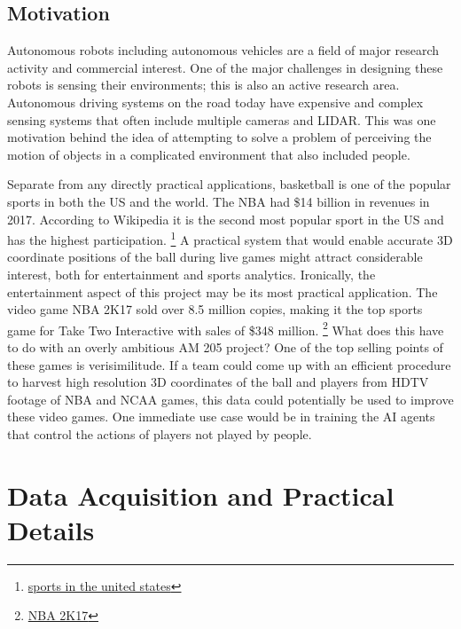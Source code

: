 \documentclass{article}
\begin{document}
\subsection{Motivation}
Autonomous robots including autonomous vehicles are a field of major research activity and commercial interest.
One of the major challenges in designing these robots is sensing their environments; this is also an active research area.
Autonomous driving systems on the road today have expensive and complex sensing systems
that often include multiple cameras and LIDAR.
This was one motivation behind the idea of attempting to solve a problem of perceiving the motion
of objects in a complicated environment that also included people.

Separate from any directly practical applications, basketball is one of the popular sports in both the US and the world.
The NBA had \$14 billion in revenues in 2017.  According to Wikipedia  it is the second most popular sport in the US
and has the highest participation.   
\footnote{\href{https://en.wikipedia.org/wiki/Sports_in_the_United_States}{sports in the united states}}
A practical system that would enable accurate 3D coordinate positions of the ball during live games might
attract considerable interest, both for entertainment and sports analytics.  
Ironically, the entertainment aspect of this project may be its most practical application.
The video game NBA 2K17 sold over 8.5 million copies, making it the top sports game for
Take Two Interactive with sales of \$348 million.
\footnote{
\href{https://venturebeat.com/2017/08/02/with-8-5-million-sales-nba-2k17-is-more-dominant-than-the-warriors/}{NBA 2K17}}
What does this have to do with an overly ambitious AM 205 project?
One of the top selling points of these games is verisimilitude.  
If a team could come up with an efficient procedure to harvest high resolution 3D coordinates of the ball and players
from HDTV footage of NBA and NCAA games, this data could potentially be used to improve these video games.
One immediate use case would be in training the AI agents that control the actions of players not played by people.

\newpage
\section{Data Acquisition and Practical Details}
\end{document}
